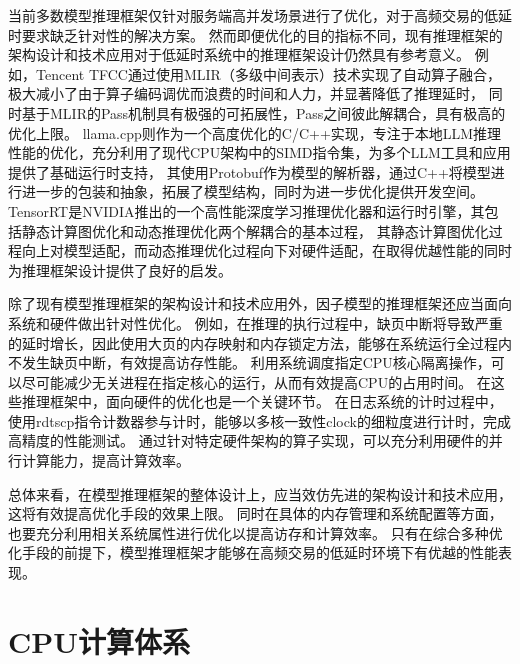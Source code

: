 当前多数模型推理框架仅针对服务端高并发场景进行了优化，对于高频交易的低延时要求缺乏针对性的解决方案。
然而即便优化的目的指标不同，现有推理框架的架构设计和技术应用对于低延时系统中的推理框架设计仍然具有参考意义。
例如，Tencent TFCC通过使用MLIR（多级中间表示）技术实现了自动算子融合，极大减小了由于算子编码调优而浪费的时间和人力，并显著降低了推理延时，
同时基于MLIR的Pass机制具有极强的可拓展性，Pass之间彼此解耦合，具有极高的优化上限。
llama.cpp则作为一个高度优化的C/C++实现，专注于本地LLM推理性能的优化，充分利用了现代CPU架构中的SIMD指令集，为多个LLM工具和应用提供了基础运行时支持，
其使用Protobuf作为模型的解析器，通过C++将模型进行进一步的包装和抽象，拓展了模型结构，同时为进一步优化提供开发空间。
TensorRT是NVIDIA推出的一个高性能深度学习推理优化器和运行时引擎，其包括静态计算图优化和动态推理优化两个解耦合的基本过程，
其静态计算图优化过程向上对模型适配，而动态推理优化过程向下对硬件适配，在取得优越性能的同时为推理框架设计提供了良好的启发。

除了现有模型推理框架的架构设计和技术应用外，因子模型的推理框架还应当面向系统和硬件做出针对性优化。
例如，在推理的执行过程中，缺页中断将导致严重的延时增长，因此使用大页的内存映射和内存锁定方法，能够在系统运行全过程内不发生缺页中断，有效提高访存性能。
利用系统调度指定CPU核心隔离操作，可以尽可能减少无关进程在指定核心的运行，从而有效提高CPU的占用时间。
在这些推理框架中，面向硬件的优化也是一个关键环节。
在日志系统的计时过程中，使用rdtscp指令计数器参与计时，能够以多核一致性clock的细粒度进行计时，完成高精度的性能测试。
通过针对特定硬件架构的算子实现，可以充分利用硬件的并行计算能力，提高计算效率。

总体来看，在模型推理框架的整体设计上，应当效仿先进的架构设计和技术应用，这将有效提高优化手段的效果上限。
同时在具体的内存管理和系统配置等方面，也要充分利用相关系统属性进行优化以提高访存和计算效率。
只有在综合多种优化手段的前提下，模型推理框架才能够在高频交易的低延时环境下有优越的性能表现。

\section{CPU计算体系}

